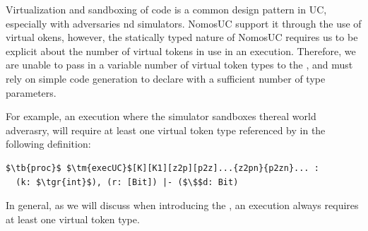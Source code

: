 Virtualization and sandboxing of code is a common design pattern in UC, especially with adversaries nd simulators.
NomosUC support it through the use of virtual okens, however, the statically typed nature of NomosUC requires us to be explicit about the number of virtual tokens in use in an execution.
Therefore, we are unable to pass in a variable number of virtual token types to the , and must rely on simple code generation to declare  with a sufficient number of type parameters.

For example, an execution where the simulator sandboxes thereal world adverasry,  will require at least one virtual token type referenced by  in the following definition:
\begin{lstlisting}[basicstyle=\footnotesize\BeraMonottFamily, frame=single, mathescape, caption={The process definition of the \msf{execUC} function.}]
$\tb{proc}$ $\tm{execUC}$[K][K1][z2p][p2z]...{z2pn}{p2zn}... :
  (k: $\tgr{int}$), (r: [Bit]) |- ($\$$d: Bit)
\end{lstlisting}
In general, as we will discuss when introducing the \partywrapper, an execution always requires at least one virtual token type.

%



